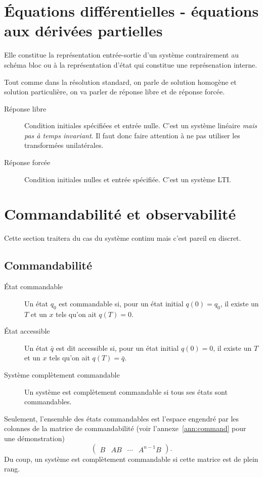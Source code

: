 \section{Équations différentielles - équations aux dérivées partielles}
Elle constitue la représentation entrée-sortie d'un système contrairement
au schéma bloc ou à la représentation d'état qui constitue une représenation
interne.

Tout comme dans la résolution standard,
on parle de solution homogène et solution particulière,
on va parler de réponse libre et de réponse forcée.
\begin{description}
  \item[Réponse libre]
    Condition initiales spécifiées et entrée nulle.
    C'est un système linéaire \emph{mais pas à temps invariant}.
    Il faut donc faire attention à ne pas utiliser les transformées
    unilatérales.
  \item[Réponse forcée]
    Condition initiales nulles et entrée spécifiée.
    C'est un système LTI.
\end{description}

\section{Commandabilité et observabilité}
Cette section traitera du cas du système continu mais c'est pareil en discret.
\subsection{Commandabilité}
\begin{description}
  \item[État commandable]
    Un état $q_0$ est commandable si,
    pour un état initial $q(0) = q_0$,
    il existe un $T$ et un $x$ tels qu'on ait $q(T) = 0$.
  \item[État accessible]
    Un état $\bar{q}$ est dit accessible si,
    pour un état initial $q(0) = 0$,
    il existe un $T$ et un $x$ tels qu'on ait $q(T) = \bar{q}$.
  \item[Système complètement commandable]
    Un système est complètement commandable si tous ses états sont
    commandables.
\end{description}

Seulement, l'ensemble des états commandables est l'espace engendré
par les colonnes de la matrice de commandabilité
(voir l'annexe~\ref{ann:command} pour une démonstration)
\[ \begin{pmatrix}B & AB & \cdots & A^{n-1}B\end{pmatrix}. \]
Du coup, un système est complètement commandable si cette matrice est de
plein rang.


